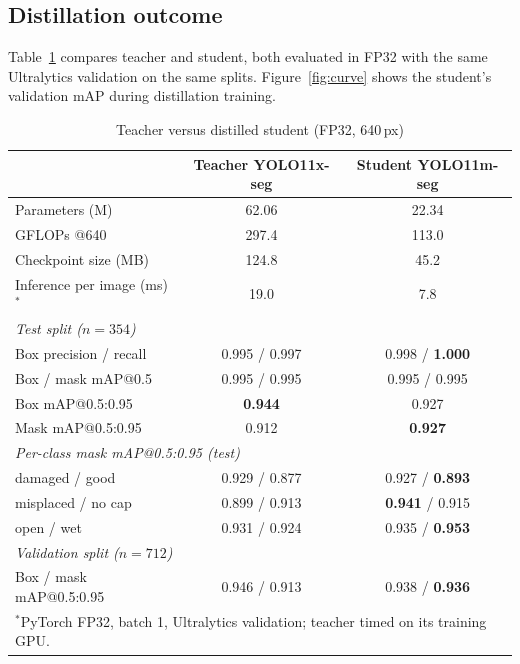 \subsection{Distillation outcome}
\label{sec:res-kd}
Table~\ref{tab:kd} compares teacher and student, both evaluated in FP32 with the same Ultralytics validation on the same splits. Figure~\ref{fig:curve} shows the student's validation mAP during distillation training.

\begin{table}[htbp]
\centering
\caption{Teacher versus distilled student (FP32, 640\,px)}
\label{tab:kd}
\footnotesize
\begin{tabular}{|l|c|c|}
\hline
 & \textbf{Teacher YOLO11x-seg} & \textbf{Student YOLO11m-seg} \\ \hline
Parameters (M) & 62.06 & 22.34 \\ \hline
GFLOPs @640 & 297.4 & 113.0 \\ \hline
Checkpoint size (MB) & 124.8 & 45.2 \\ \hline
Inference per image (ms)$^{*}$ & 19.0 & 7.8 \\ \hline
\multicolumn{3}{|l|}{\textit{Test split ($n=354$)}} \\ \hline
Box precision / recall & 0.995 / 0.997 & 0.998 / \textbf{1.000} \\ \hline
Box / mask mAP@0.5 & 0.995 / 0.995 & 0.995 / 0.995 \\ \hline
Box mAP@0.5:0.95 & \textbf{0.944} & 0.927 \\ \hline
Mask mAP@0.5:0.95 & 0.912 & \textbf{0.927} \\ \hline
\multicolumn{3}{|l|}{\textit{Per-class mask mAP@0.5:0.95 (test)}} \\ \hline
damaged / good & 0.929 / 0.877 & 0.927 / \textbf{0.893} \\ \hline
misplaced / no cap & 0.899 / 0.913 & \textbf{0.941} / 0.915 \\ \hline
open / wet & 0.931 / 0.924 & 0.935 / \textbf{0.953} \\ \hline
\multicolumn{3}{|l|}{\textit{Validation split ($n=712$)}} \\ \hline
Box / mask mAP@0.5:0.95 & 0.946 / 0.913 & 0.938 / \textbf{0.936} \\ \hline
\multicolumn{3}{l}{\scriptsize $^{*}$PyTorch FP32, batch 1, Ultralytics validation; teacher timed on its training GPU.}
\end{tabular}
\end{table}

